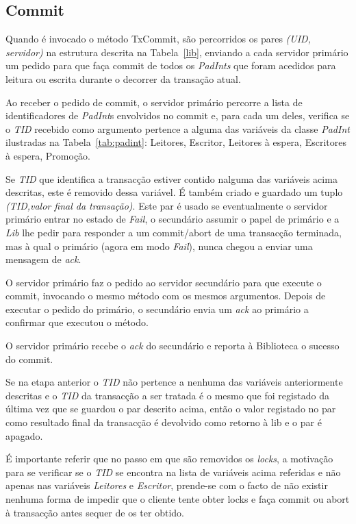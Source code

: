 \subsection{Commit}

Quando é invocado o método TxCommit, são percorridos os pares \textit{(UID, servidor)} na estrutura descrita na Tabela~\ref{lib}, enviando a cada servidor primário um pedido para que faça commit de todos os \textit{PadInts} que foram acedidos para leitura ou escrita durante o decorrer da transação atual.

Ao receber o pedido de commit, o servidor primário percorre a lista de identificadores de \textit{PadInt}s envolvidos no commit e, para cada um deles, verifica se o \textit{TID} recebido como argumento pertence a alguma das variáveis da classe \textit{PadInt} ilustradas na Tabela~\ref{tab:padint}: Leitores, Escritor, Leitores à espera, Escritores à espera, Promoção.

Se \textit{TID} que identifica a transacção estiver contido nalguma das variáveis acima descritas, este é removido dessa variável. É também criado e guardado um tuplo \textit{(TID,valor final da transação)}. Este par é usado se eventualmente o servidor primário entrar no estado de \textit{Fail}, o secundário assumir o papel de primário e a \textit{Lib} lhe pedir para responder a um commit/abort de uma transacção terminada, mas à qual o primário (agora em modo \textit{Fail}), nunca chegou a enviar uma mensagem de \textit{ack}.

O servidor primário faz o pedido ao servidor secundário para que execute o commit, invocando o mesmo método com os mesmos argumentos. Depois de executar o pedido do primário, o secundário envia um \textit{ack} ao primário a confirmar que executou o método.

O servidor primário recebe o \textit{ack} do secundário e reporta à Biblioteca o sucesso do commit.

Se na etapa anterior o \textit{TID} não pertence a nenhuma das variáveis anteriormente descritas e o \textit{TID} da transacção a ser tratada é o mesmo que foi registado da última vez que se guardou o par descrito acima, então o valor registado no par como resultado final da transacção é devolvido como retorno à lib e o par é apagado.

É importante referir que no passo em que são removidos os \textit{locks}, a motivação para se verificar se o \textit{TID} se encontra na lista de variáveis acima referidas e não apenas nas variáveis \textit{Leitores} e \textit{Escritor}, prende-se com o facto de não existir nenhuma forma de impedir que o cliente tente obter locks e faça commit ou abort à transacção antes sequer de os ter obtido.